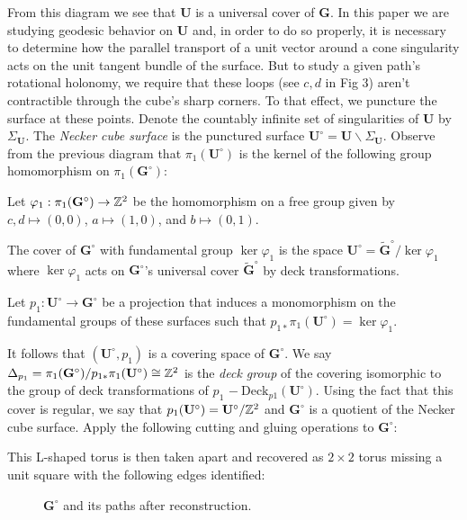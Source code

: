 \documentclass[a4paper, 11pt]{article}
\def\bU{\mathbf{U}} \def\btU{\tilde{\bU}} \def\bUs{\bU^\circ}
\def\bG{\mathbf{G}} \def\bGs{\mathbf{G}^\circ}
\begin{document}
\begin{figure}[H]
\centering

\end{figure}
From this diagram we see that $\bU$ is a universal cover of $\bG$. In this paper we are studying geodesic behavior on $\bU$ and, in order to do so properly, it is necessary to determine how the parallel transport of a unit vector around a cone singularity acts on the unit tangent bundle of the surface. But to study a given path's rotational holonomy, we require that these loops (see $c,d$ in Fig 3) aren't contractible through the cube's sharp corners. To that effect, we puncture the surface at these points.  Denote the countably infinite set of singularities of $\bU$ by $\Sigma_{\bU}$. The \emph{Necker cube surface} is the punctured surface $\bUs=\bU\backslash\Sigma_{\bU}$. Observe from the previous diagram that $\pi_1(\bUs)$ is the kernel of the following group homomorphism on $\pi_1(\bGs)$:

\begin{Def}
Let $\varphi_1:\pi_1(\bGs)\rightarrow \ZZ^2$ be the homomorphism on a free group given by $c,d\mapsto(0,0)$, $a\mapsto(1,0)$, and $b\mapsto(0,1)$.
\end{Def}

The cover of $\bGs$ with fundamental group $\ker\varphi_1$ is the space $\bUs=\tilde{\mathbf{G}}^\circ/\ker\varphi_1$ where $\ker\varphi_1$ acts on $\bGs$'s universal cover $\tilde{\mathbf{G}}^\circ$ by deck transformations.

\begin{Def}
Let $p_1:\bUs\rightarrow\bGs$ be a projection that induces a monomorphism on the fundamental groups of these surfaces such that $p_{1*}\pi_1(\bUs)=\ker\varphi_1$.
\end{Def}

It follows that $(\bUs,p_1)$ is a covering space of $\bGs$. We say $\Delta_{p_1}=\pi_1(\bGs)/p_{1*}\pi_1(\bUs)\cong\ZZ^2$ is the \emph{deck group} of the covering isomorphic to the group of deck transformations of $p_1$ $-~\text{Deck}_{p1}(\bUs)$. Using the fact that this cover is regular, we say that $p_1(\bUs)=\bUs/\ZZ^2$ and $\bGs$ is a quotient of the Necker cube surface. Apply the following cutting and gluing operations to $\bGs$: \\
\begin{figure}[H]
\centering

\end{figure}
\noindent This L-shaped torus is then taken apart and recovered as $2\times 2$ torus missing a unit square with the following edges identified:\\
\begin{figure}[H]
\centering

\caption{$\bGs$ and its paths after reconstruction.}
\end{figure}
\end{document}
